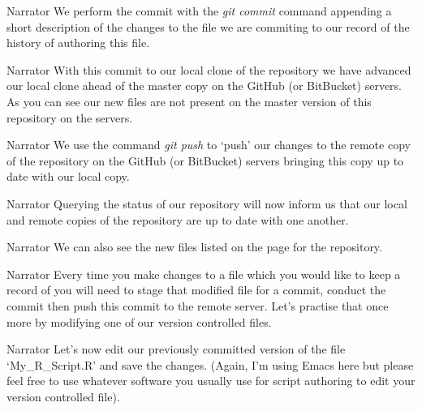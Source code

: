 \documentclass{screenplay} %
\begin{document}
\begin{dialogue}{Narrator}
We perform the commit with the \textit{git commit} command appending a short description of the changes to the file we are commiting to our record of the history of authoring this file.
\end{dialogue}

\begin{dialogue}{Narrator}
With this commit to our local clone of the repository we have advanced our local clone ahead of the master copy on the GitHub (or BitBucket) servers. As you can see our new files are not present on the master version of this repository on the servers.
\end{dialogue}

\begin{dialogue}{Narrator}
We use the command \textit{git push} to `push' our changes to the remote copy of the repository on the GitHub (or BitBucket) servers bringing this copy up to date with our local copy.
\end{dialogue}

\begin{dialogue}{Narrator}
Querying the status of our repository will now inform us that our local and remote copies of the repository are up to date with one another.
\end{dialogue}

\begin{dialogue}{Narrator}
We can also see the new files listed on the page for the repository.
\end{dialogue}

\begin{dialogue}[]{Narrator}
Every time you make changes to a file which you would like to keep a record of you will need to stage that modified file for a commit, conduct the commit then push this commit to the remote server.  Let's practise that once more by modifying one of our version controlled files.
\end{dialogue}

\begin{dialogue}{Narrator}
Let's now edit our previously committed version of the file `My\_R\_Script.R' and save the changes. (Again, I'm using Emacs here but please feel free to use whatever software you usually use for script authoring to edit your version controlled file).
\end{dialogue}
\end{document}
